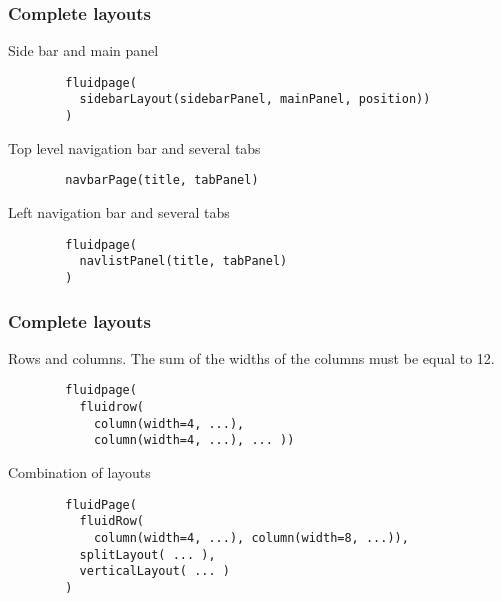 \documentclass{beamer}
\begin{document}
	\begin{frame}[fragile]
		\frametitle{Complete layouts}
		
		Side bar and main panel
		\begin{exampleblock}{}
		\begin{BVerbatim}
		fluidpage(
		  sidebarLayout(sidebarPanel, mainPanel, position))
		)
		\end{BVerbatim}
		\end{exampleblock}{}

		\vspace{1em}

		Top level navigation bar and several tabs
		\begin{exampleblock}{}
		\begin{BVerbatim}
		navbarPage(title, tabPanel)
		\end{BVerbatim}
		\end{exampleblock}{}

		\vspace{1em}

		Left navigation bar and several tabs
		\begin{exampleblock}{}
		\begin{BVerbatim}
		fluidpage(
		  navlistPanel(title, tabPanel)
		)
		\end{BVerbatim}
		\end{exampleblock}{}

	\end{frame}

	\begin{frame}[fragile]
		\frametitle{Complete layouts}
		
		Rows and columns. The sum of the widths of the columns must be equal to 12.
		\begin{exampleblock}{}
		\begin{BVerbatim}
		fluidpage(
		  fluidrow(
		    column(width=4, ...),
		    column(width=4, ...), ... ))
		\end{BVerbatim}
		\end{exampleblock}{}

		\vspace{1em}

		Combination of layouts
		\begin{exampleblock}{}
		\begin{BVerbatim}
		fluidPage(
		  fluidRow(
		    column(width=4, ...), column(width=8, ...)),
		  splitLayout( ... ),
		  verticalLayout( ... )
		)
		\end{BVerbatim}
		\end{exampleblock}{}

	\end{frame}
\end{document}
